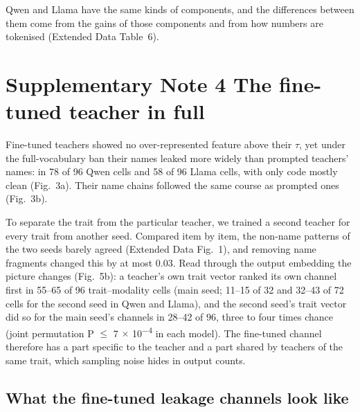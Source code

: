Qwen and Llama have the same kinds of components, and the differences between them come from the gains of those components and from how numbers are tokenised (Extended Data Table~6).


\section*{Supplementary Note 4 \textperiodcentered{} The fine-tuned teacher in full}

Fine-tuned teachers showed no over-represented feature above their $\tau$, yet under the full-vocabulary ban their names leaked more widely than prompted teachers' names: in 78 of 96 Qwen cells and 58 of 96 Llama cells, with only code mostly clean (Fig.~3a). Their name chains followed the same course as prompted ones (Fig.~3b).


To separate the trait from the particular teacher, we trained a second teacher for every trait from another seed. Compared item by item, the non-name patterns of the two seeds barely agreed (Extended Data Fig.~1), and removing name fragments changed this by at most 0.03. Read through the output embedding the picture changes (Fig.~5b): a teacher's own trait vector ranked its own channel first in 55--65 of 96 trait--modality cells (main seed; 11--15 of 32 and 32--43 of 72 cells for the second seed in Qwen and Llama), and the second seed's trait vector did so for the main seed's channels in 28--42 of 96, three to four times chance (joint permutation P $\leq$ 7 $\times$ 10\textsuperscript{$-$4} in each model). The fine-tuned channel therefore has a part specific to the teacher and a part shared by teachers of the same trait, which sampling noise hides in output counts.


\subsection*{What the fine-tuned leakage channels look like}

